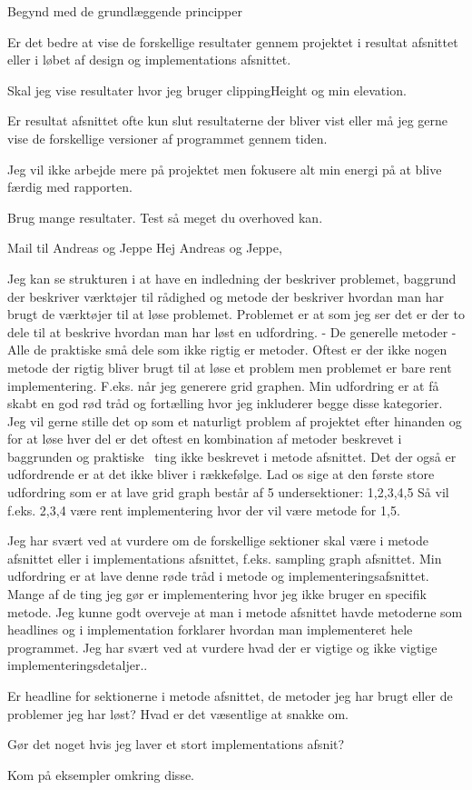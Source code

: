 Begynd med de grundlæggende principper

Er det bedre at vise de forskellige resultater gennem projektet i resultat afsnittet eller i løbet af design og implementations afsnittet.

Skal jeg vise resultater hvor jeg bruger clippingHeight og min elevation.

Er resultat afsnittet ofte kun slut resultaterne der bliver vist eller må jeg gerne vise de forskellige versioner af programmet gennem tiden.

Jeg vil ikke arbejde mere på projektet men fokusere alt min energi på at blive færdig med rapporten.

Brug mange resultater. Test så meget du overhoved kan.


Mail til Andreas og Jeppe
Hej Andreas og Jeppe,

Jeg kan se strukturen i at have en indledning der beskriver problemet, baggrund der beskriver værktøjer til rådighed og metode der beskriver hvordan man har brugt de værktøjer til at løse problemet.
Problemet er at som jeg ser det er der to dele til at beskrive hvordan man har løst en udfordring.
- De generelle metoder
- Alle de praktiske små dele som ikke rigtig er metoder.
Oftest er der ikke nogen metode der rigtig bliver brugt til at løse et problem men problemet er bare rent implementering. F.eks. når jeg generere grid graphen.
Min udfordring er at få skabt en god rød tråd og fortælling hvor jeg inkluderer begge disse kategorier. Jeg vil gerne stille det op som et naturligt problem af projektet efter hinanden og for at løse hver del er det oftest en kombination af metoder beskrevet i baggrunden og praktiske  ting ikke beskrevet i metode afsnittet.
Det der også er udfordrende er at det ikke bliver i rækkefølge. Lad os sige at den første store udfordring som er at lave grid graph består af 5 undersektioner: 1,2,3,4,5 Så vil f.eks. 2,3,4 være rent implementering hvor der vil være metode for 1,5.

Jeg har svært ved at vurdere om de forskellige sektioner skal være i metode afsnittet eller i implementations afsnittet, f.eks. sampling graph afsnittet.
Min udfordring er at lave denne røde tråd i metode og implementeringsafsnittet. Mange af de ting jeg gør er implementering hvor jeg ikke bruger en specifik metode. Jeg kunne godt overveje at man i metode afsnittet havde metoderne som headlines og i implementation forklarer hvordan man implementeret hele programmet. Jeg har svært ved at vurdere hvad der er vigtige og ikke vigtige implementeringsdetaljer..

Er headline for sektionerne i metode afsnittet, de metoder jeg har brugt eller de problemer jeg har løst? Hvad er det væsentlige at snakke om. 

Gør det noget hvis jeg laver et stort implementations afsnit?

Kom på eksempler omkring disse.